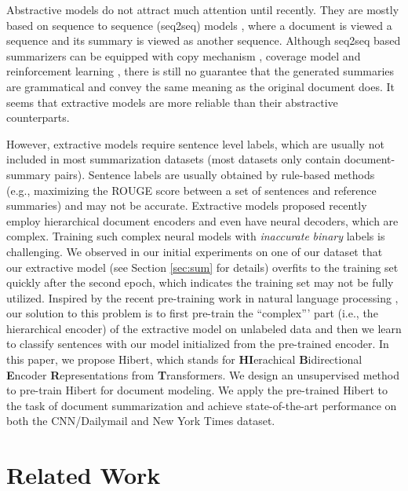 \documentclass[11pt,a4paper]{article}
\begin{document}
Abstractive models do not attract much attention until recently. They are mostly based on sequence to sequence (seq2seq) models \cite{bahdanau:2015:iclr}, where a document is viewed a sequence and its summary is viewed as another sequence. Although seq2seq based summarizers can be equipped with copy mechanism \cite{gu:2016:acl,see:2017:acl}, coverage model \cite{see:2017:acl} and reinforcement learning \cite{paulus:2017:arxiv}, there is still no guarantee that the generated summaries are grammatical and convey the same meaning as the original document does. It seems that extractive models are more reliable than their abstractive counterparts.

However, extractive models require sentence level labels, which are usually not included in most summarization datasets (most datasets only contain document-summary pairs). Sentence labels are usually obtained by rule-based methods (e.g., maximizing the ROUGE score between a set of sentences and reference summaries) and may not be accurate. Extractive models proposed recently \cite{cheng:2016:acl,nallapati:2017:aaai} employ hierarchical document encoders and even have neural decoders, which are complex. Training such complex neural models with \emph{inaccurate} \emph{binary} labels is challenging. We observed in our initial experiments on one of our dataset that our extractive model (see Section \ref{sec:sum} for details) overfits to the training set quickly after the second epoch, which indicates the training set may not be fully utilized. Inspired by the recent pre-training work in natural language processing \cite{peters:2018:naacl,radford:2018:nips,devlin:2018:arxiv}, our solution to this problem is to first pre-train the ``complex''' part (i.e., the hierarchical  encoder) of the extractive model on unlabeled data and then we learn to classify sentences with our model initialized from the pre-trained encoder.  In this paper, we propose \mbox{{\sc Hibert}}, which stands for {\bf HI}erachical {\bf B}idirectional {\bf E}ncoder {\bf R}epresentations from {\bf T}ransformers. We design an unsupervised method to pre-train \mbox{{\sc Hibert}} for document modeling. We apply the pre-trained \mbox{{\sc Hibert}} to the task of document summarization and achieve state-of-the-art performance on both the CNN/Dailymail and New York Times dataset. 

\section{Related Work}
\end{document}
